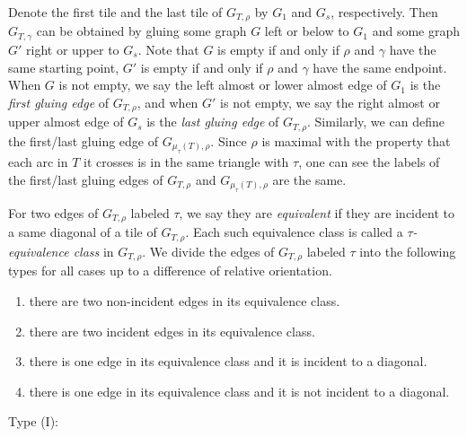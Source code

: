\documentclass[10pt]{amsart}
\theoremstyle{theorems}
\begin{document}
\medskip

Denote the first tile and the last tile of $G_{T,\rho}$ by $G_1$ and $G_s$, respectively. Then $G_{T,\gamma}$ can be obtained by gluing some graph $G$ left or below to $G_1$ and some graph $G'$ right or upper to $G_s$. Note that $G$ is empty if and only if $\rho$ and $\gamma$ have the same starting point, $G'$ is empty if and only if $\rho$ and $\gamma$ have the same endpoint. When $G$ is not empty, we say the left almost or lower almost edge of $G_1$ is the \emph{first gluing edge} of $G_{T,\rho}$, and when $G'$ is not empty, we say the right almost or upper almost edge of $G_s$ is the \emph{last gluing edge} of $G_{T,\rho}$. Similarly, we can define the first/last gluing edge of $G_{\mu_{\tau}(T),\rho}$. Since $\rho$ is maximal with the property that each arc in $T$ it crosses is in the same triangle with $\tau$, one can see the labels of the first/last gluing edges of $G_{T,\rho}$ and $G_{\mu_{\tau}(T),\rho}$ are the same.

\medskip

For two edges of $G_{T,\rho}$ labeled $\tau$, we say they are \emph{equivalent} if they are incident to a same diagonal of a tile of $G_{T,\rho}$. Each such equivalence class is called a \emph{$\tau$-equivalence class} in $G_{T,\rho}$. We divide the edges of $G_{T,\rho}$ labeled $\tau$ into the following types for all cases up to a difference of relative orientation.

\begin{enumerate}[$(I)$]

  \item there are two non-incident edges in its equivalence class.

  \item there are two incident edges in its equivalence class.

  \item there is one edge in its equivalence class and it is incident to a diagonal.

  \item there is one edge in its equivalence class and it is not incident to a diagonal.

\end{enumerate}

Type (I):
\end{document}
